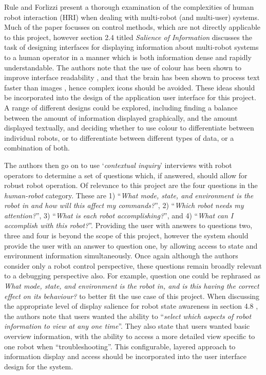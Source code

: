 Rule and Forlizzi \cite{Rule:2012} present a thorough examination of the complexities of human robot interaction (HRI) when dealing with multi-robot (and multi-user) systems. Much of the paper focusses on control methods, which are not directly applicable to this project, however section 2.4 titled \textit{Salience of Information} discusses the task of designing interfaces for displaying information about multi-robot systems to a human operator in a manner which is both information dense and rapidly understandable. The authors note that the use of colour has been shown to improve interface readability \cite{Christ:1984}, and that the brain has been shown to process text faster than images \cite{Carney:1998}, hence complex icons should be avoided. These ideas should be incorporated into the design of the application user interface for this project. A range of different designs could be explored, including finding a balance between the amount of information displayed graphically, and the amount displayed textually, and deciding whether to use colour to differentiate between individual robots, or to differentiate between different types of data, or a combination of both.

The authors \cite{Rule:2012} then go on to use `\textit{contextual inquiry}' interviews with robot operators to determine a set of questions which, if answered, should allow for robust robot operation. Of relevance to this project are the four questions in the \textit{human-robot} category. These are 1) ``\textit{What mode, state, and environment is the robot in and how will this affect my commands?}'', 2) ``\textit{Which robot needs my attention?}'', 3) ``\textit{What is each robot accomplishing?}'', and 4) ``\textit{What can I accomplish with this robot?}''. Providing the user with answers to questions two, three and four is beyond the scope of this project, however the system should provide the user with an answer to question one, by allowing access to state and environment information simultaneously. Once again although the authors \cite{Rule:2012} consider only a robot control perspective, these questions remain broadly relevant to a debugging perspective also. For example, question one could be rephrased as \textit{What mode, state, and environment is the robot in, and is this having the correct effect on its behaviour?} to better fit the use case of this project. When discussing the appropriate level of display salience for robot state awareness in section 4.8 \cite{Rule:2012}, the authors note that users wanted the ability to ``\textit{select which aspects of robot information to view at any one time}''. They also state that users wanted basic overview information, with the ability to access a more detailed view specific to one robot when ``troubleshooting''. This configurable, layered approach to information display and access should be incorporated into the user interface design for the system.

